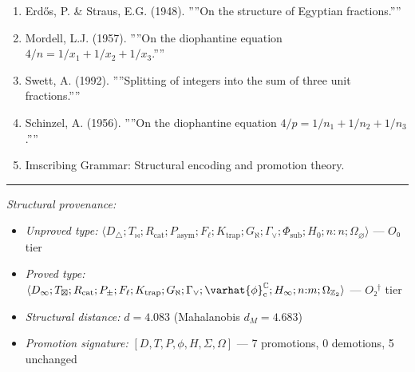 \documentclass[12pt,a4paper]{article}
\begin{document}
\begin{enumerate}
    \item Erdős, P. \& Straus, E.G. (1948). ''''On the structure of Egyptian fractions.''''
    \item Mordell, L.J. (1957). ''''On the diophantine equation $4/n = 1/x_1 + 1/x_2 + 1/x_3$.''''
    \item Swett, A. (1992). ''''Splitting of integers into the sum of three unit fractions.''''
    \item Schinzel, A. (1956). ''''On the diophantine equation $4/p = 1/n_1 + 1/n_2 + 1/n_3$.''''
    \item Imscribing Grammar: Structural encoding and promotion theory.
\end{enumerate}

\begin{center}
\rule{0.5\textwidth}{0.4pt}
\end{center}

\emph{Structural provenance:}

\begin{itemize}
    \item \emph{Unproved type:} $\langle D_{\triangle}; T_{\bowtie}; R_\text{cat}; P_\text{asym}; F_{\ell}; K_\text{trap}; G_{\aleph}; \Gamma_{\vee}; \Phi_\text{sub}; H_0; n{:}n; \Omega_{\varnothing} \rangle$ --- $O₀$ tier
    \item \emph{Proved type:} $\langle D_{\infty}; T_{\boxtimes}; R_\text{cat}; P_{\pm}; F_{\ell}; K_\text{trap}; G_{\aleph}; \Gamma_{\vee}; \varhat{\phi}^{\mathbb{C}}_\text{c}; H_{\infty}; n{:}m; \Omega_{\mathbb{Z}_2} \rangle$ --- $O₂^\dagger$ tier
    \item \emph{Structural distance:} $d = 4.083$ (Mahalanobis $d_M = 4.683$)
    \item \emph{Promotion signature:} $[D, T, P, \phi, H, \Sigma, \Omega]$ --- 7 promotions, 0 demotions, 5 unchanged
\end{itemize}
\end{document}
